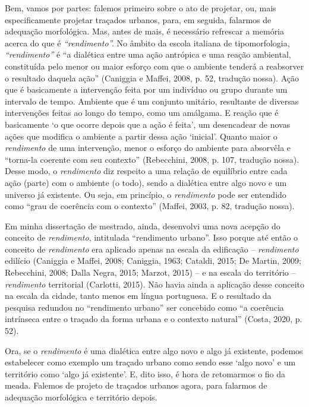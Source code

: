 \documentclass[12pt, a4paper]{book} %
\begin{document}
        Bem, vamos por partes: falemos primeiro sobre o ato de projetar, ou, mais especificamente projetar traçados urbanos, para, em seguida, falarmos de adequação morfológica. Mas, antes de mais, é necessário refrescar a memória acerca do que é \textit{``rendimento''.} No âmbito da escola italiana de tipomorfologia, \textit{``rendimento''} é ``a dialética entre uma ação antrópica e uma reação ambiental, constituída pelo menor ou maior esforço com que o ambiente tenderá a reabsorver o resultado daquela ação'' (Caniggia e Maffei, 2008, p. 52, tradução nossa). Ação que é basicamente a intervenção feita por um indivíduo ou grupo durante um intervalo de tempo. Ambiente que é um conjunto unitário, resultante de diversas intervenções feitas ao longo do tempo, como um amálgama. E reação que é basicamente `o que ocorre depois que a ação é feita', um desencadear de novas ações que modifica o ambiente a partir dessa ação `inicial'. Quanto maior o \textit{rendimento} de uma intervenção, menor o esforço do ambiente para absorvêla e ``torna-la coerente com seu contexto'' (Rebecchini, 2008, p. 107, tradução nossa). Desse modo, o \textit{rendimento} diz respeito a uma relação de equilíbrio entre cada ação (parte) com o ambiente (o todo), sendo a dialética entre algo novo e um universo já existente. Ou seja, em princípio, o \textit{rendimento} pode ser entendido como ``grau de coerência com o contexto'' (Maffei, 2003, p. 82, tradução nossa).

        Em minha dissertação de mestrado, ainda, desenvolvi uma nova acepção do conceito de \textit{rendimento}, intitulada ``rendimento urbano''. Isso porque até então o conceito de \textit{rendimento} era aplicado apenas na escala da edificação – \textit{rendimento} edilício (Caniggia e Maffei, 2008; Caniggia, 1963; Cataldi, 2015; De Martin, 2009; Rebecchini, 2008; Dalla Negra, 2015; Marzot, 2015) – e na escala do território – \textit{rendimento} territorial (Carlotti, 2015). Não havia ainda a aplicação desse conceito na escala da cidade, tanto menos em língua portuguesa. E o resultado da pesquisa redundou no ``rendimento urbano'' ser concebido como ``a coerência intrínseca entre o traçado da forma urbana e o contexto natural'' (Costa, 2020, p. 52).

        Ora, se o \textit{rendimento} é uma dialética entre algo novo e algo já existente, podemos estabelecer como exemplo um traçado urbano como sendo esse `algo novo' e um território como `algo já existente'. E, dito isso, é hora de retomarmos o fio da meada. Falemos de projeto de traçados urbanos agora, para falarmos de adequação morfológica e território depois.
\end{document}
